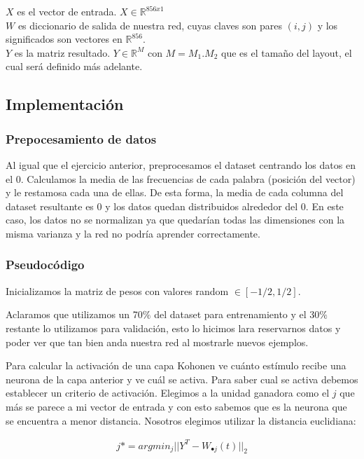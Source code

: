 $X$ es el vector de entrada. $X \in \mathbb{R}^{856x1}$ \\

$W$ es diccionario de salida de nuestra red, cuyas claves son pares $(i,j)$ y los significados son vectores en $\mathbb{R}^{856}$.\\

$Y$ es la matriz resultado. $Y \in \mathbb{R}^{M}$ con $M = M_{1} . M_{2}$ que es el tamaño del layout, el cual será definido más adelante.\\

\subsection{Implementación}

\subsubsection{Prepocesamiento de datos}
Al igual que el ejercicio anterior, preprocesamos el dataset centrando los datos en el 0. Calculamos la media de las frecuencias de cada palabra (posición del vector) y le restamosa cada una de ellas. De esta forma, la media de cada columna del dataset resultante es 0 y los datos quedan distribuidos alrededor del 0. En este caso, los datos no se normalizan ya que quedarían todas las dimensiones con la misma varianza y la red no podría aprender correctamente.

\subsubsection{Pseudocódigo}

Inicializamos la matriz de pesos con valores random $\in[-1/2, 1/2]$.

Aclaramos que utilizamos un 70$\%$ del dataset para entrenamiento y el 30$\%$ restante lo utilizamos para validación, esto lo hicimos lara reservarnos datos y poder ver que tan bien anda nuestra red al mostrarle nuevos ejemplos.

Para calcular la activación de una capa Kohonen ve cuánto estímulo recibe una neurona de la capa anterior y ve cuál se activa. Para saber cual se activa debemos establecer un criterio de activación. Elegimos a la unidad ganadora como el $j$ que más se parece a mi vector de entrada y con esto sabemos que es la neurona que se encuentra a menor distancia. Nosotros elegimos utilizar la distancia euclidiana:

\begin{align*}
		j* = argmin_{j}||Y^{T} - W_{\bullet j}(t)||_{2}
\end{align*}

